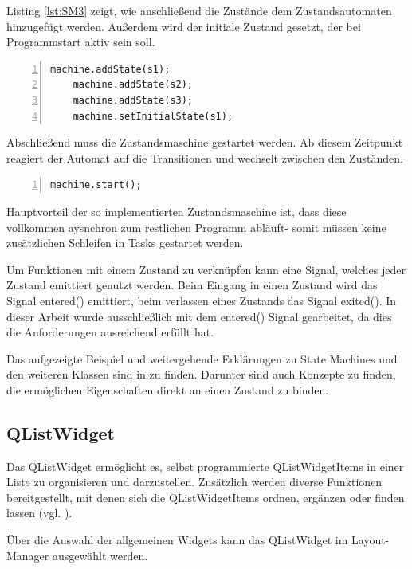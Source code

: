 Listing \ref{lst:SM3} zeigt, wie anschließend die Zustände dem Zustandsautomaten hinzugefügt werden. Außerdem wird der initiale Zustand gesetzt, der bei Programmstart aktiv sein soll. 

\begin{lstlisting}[frame=single, breaklines=true, numbers=left, stepnumber=2, firstnumber=1, numberstyle = \tiny, caption=State Machine Beispiel Teil 3 ,label=lst:SM3]
    machine.addState(s1);
    machine.addState(s2);
    machine.addState(s3);
    machine.setInitialState(s1);
\end{lstlisting}

Abschließend muss die Zustandsmaschine gestartet werden. Ab diesem Zeitpunkt reagiert der Automat auf die Transitionen und wechselt zwischen den Zuständen. 

\begin{lstlisting}[frame=single, breaklines=true, numbers=left, stepnumber=2, firstnumber=1, numberstyle = \tiny, caption=State Machine Beispiel Teil 4 ,label=lst:SM4]
    machine.start();
\end{lstlisting}

Hauptvorteil der so implementierten Zustandsmaschine ist, dass diese vollkommen aysnchron zum restlichen Programm abläuft- somit müssen keine zusätzlichen Schleifen in Tasks gestartet werden. 

Um Funktionen mit einem Zustand zu verknüpfen kann eine Signal, welches jeder Zustand emittiert genutzt werden. Beim Eingang in einen Zustand wird das Signal entered() emittiert, beim verlassen eines Zustands das Signal exited(). In dieser Arbeit wurde ausschließlich mit dem entered() Signal gearbeitet, da dies die Anforderungen ausreichend erfüllt hat. 

Das aufgezeigte Beispiel und weitergehende Erklärungen zu State Machines und den weiteren Klassen sind in \cite{qt_statemachine} zu finden. Darunter sind auch Konzepte zu finden, die ermöglichen Eigenschaften direkt an einen Zustand zu binden. 

\subsection{QListWidget}
\label{sec:QListWidgetItem}

Das QListWidget ermöglicht es, selbst programmierte QListWidgetItems in einer Liste zu organisieren und darzustellen. Zusätzlich werden diverse Funktionen bereitgestellt, mit denen sich die QListWidgetItems ordnen, ergänzen oder finden lassen (vgl. \cite{qt_listwidget}). 

Über die Auswahl der allgemeinen Widgets kann das QListWidget im Layout-Manager ausgewählt werden. 
